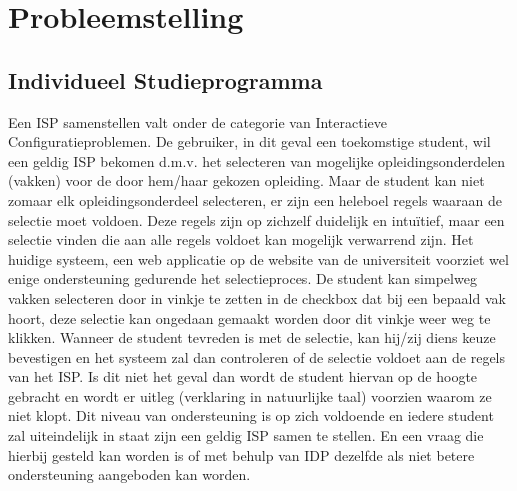 \section{Probleemstelling}

\subsection{Individueel Studieprogramma}
Een ISP samenstellen valt onder de categorie van Interactieve Configuratieproblemen. De gebruiker, in dit geval een toekomstige student, wil een geldig ISP bekomen d.m.v. het selecteren van mogelijke opleidingsonderdelen (vakken) voor de door hem/haar gekozen opleiding. Maar de student kan niet zomaar elk opleidingsonderdeel selecteren, er zijn een heleboel regels waaraan de selectie moet voldoen. Deze regels zijn op zichzelf duidelijk en intu\"{i}tief, maar een selectie vinden die aan alle regels voldoet kan mogelijk verwarrend zijn. Het huidige systeem, een web applicatie op de website van de universiteit voorziet wel enige ondersteuning gedurende het selectieproces. De student kan simpelweg vakken selecteren door in vinkje te zetten in de checkbox dat bij een bepaald vak hoort, deze selectie kan ongedaan gemaakt worden door dit vinkje weer weg te klikken. Wanneer de student tevreden is met de selectie, kan hij/zij diens keuze bevestigen en het systeem zal dan controleren of de selectie voldoet aan de regels van het ISP. Is dit niet het geval dan wordt de student hiervan op de hoogte gebracht en wordt er uitleg (verklaring in natuurlijke taal) voorzien waarom ze niet klopt. Dit niveau van ondersteuning is op zich voldoende en iedere student zal uiteindelijk in staat zijn een geldig ISP samen te stellen. En een vraag die hierbij gesteld kan worden is of met behulp van IDP dezelfde als niet betere ondersteuning aangeboden kan worden. 

